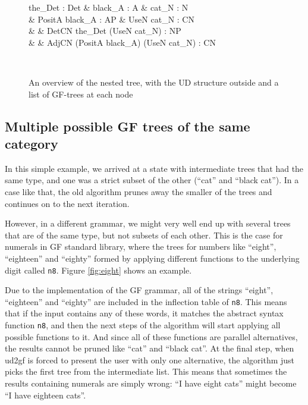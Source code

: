 \begin{figure}
    \centering
    \setlength{\unitlength}{0.2mm}
    \begin{dependency}
        \begin{deptext}[column sep=0.4cm]
              the\_Det : Det \& black\_A : A \& cat\_N : N \\
            \& PositA black\_A : AP \& UseN cat\_N : CN \\
            \& \& DetCN the\_Det (UseN cat\_N) : NP \\
            \& \& AdjCN (PositA black\_A) (UseN cat\_N) : CN \\
        \end{deptext}
    \end{dependency} \\
    \caption{An overview of the nested tree, with the UD structure outside and a list of GF-trees at each node}
    \label{fig:final_nested_compact}
\end{figure}

\subsection{Multiple possible GF trees of the same category}
\label{sec:multiple_trees}

In this simple example, we arrived at a state with intermediate trees that had the same type, and one was a strict subset of the other (``cat'' and ``black cat''). In a case like that, the old algorithm prunes away the smaller of the trees and continues on to the next iteration. 

However, in a different grammar, we might very well end up with several trees that are of the same type, but not subsets of each other. This is the case for numerals in GF standard library, where the trees for numbers like ``eight'', ``eighteen'' and ``eighty'' formed by applying different functions to the underlying digit called \texttt{n8}. Figure \ref{fig:eight} shows an example.

Due to the implementation of the GF grammar, all of the strings ``eight'', ``eighteen'' and ``eighty'' are included in the inflection table of \texttt{n8}. This means that if the input contains any of these words, it matches the abstract syntax function \texttt{n8}, and then the next steps of the algorithm will start applying all possible functions to it. And since all of these functions are parallel alternatives, the results cannot be pruned like ``cat'' and ``black cat''. At the final step, when ud2gf is forced to present the user with only one alternative, the algorithm just picks the first tree from the intermediate list. This means that sometimes the results containing numerals are simply wrong: ``I have eight cats'' might become ``I have eighteen cats''.

